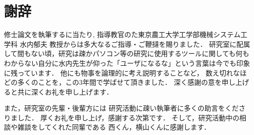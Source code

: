\chapter*{謝辞}
 修士論文を執筆するに当たり, 指導教官のた東京農工大学工学部機械システム工学科 水内郁夫 教授からは多大なるご指導・ご鞭撻を賜りました．
 研究室に配属して間もない頃，研究は疎かパソコン等の研究に使用するツールに関しても何もわからない自分に水内先生が仰った「ユーザになるな」という言葉は今でも印象に残っています．
 他にも物事を論理的に考え説明することなど，
 数え切れなほどの多くのことを，この3年間で学ばせて頂きました．
 深く感謝の意を申し上げると共に深くお礼を申し上げます．

 また，研究室の先輩・後輩方には
 研究活動に疎い執筆者に多くの助言をくださりました．
 厚くお礼を申し上げ，感謝する次第です．
 そして，研究活動中の相談や雑談をしてくれた同輩である
 西くん，横山くんに感謝します．
 
 
 
 
 
